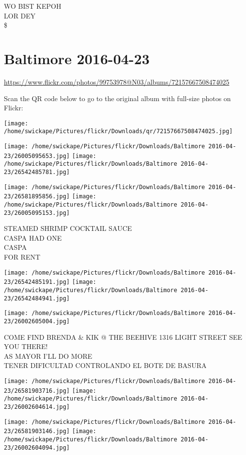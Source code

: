 \documentclass[10pt,letterpaper]{article}
\begin{document}
WO BIST KEPOH\\
LOR DEY\\
\$
\pagebreak

\section*{Baltimore 2016-04-23}

\url{https://www.flickr.com/photos/99753978@N03/albums/72157667508474025}

Scan the QR code below to go to the original album with full-size photos on Flickr:

\texttt{[image: /home/swickape/Pictures/flickr/Downloads/qr/72157667508474025.jpg]}
\pagebreak

\texttt{[image: /home/swickape/Pictures/flickr/Downloads/Baltimore 2016-04-23/26005095653.jpg]}
\texttt{[image: /home/swickape/Pictures/flickr/Downloads/Baltimore 2016-04-23/26542485781.jpg]}

\texttt{[image: /home/swickape/Pictures/flickr/Downloads/Baltimore 2016-04-23/26581895856.jpg]}
\texttt{[image: /home/swickape/Pictures/flickr/Downloads/Baltimore 2016-04-23/26005095153.jpg]}

STEAMED SHRIMP COCKTAIL SAUCE\\
CASPA HAD ONE\\
CASPA\\
FOR RENT
\pagebreak

\texttt{[image: /home/swickape/Pictures/flickr/Downloads/Baltimore 2016-04-23/26542485191.jpg]}
\texttt{[image: /home/swickape/Pictures/flickr/Downloads/Baltimore 2016-04-23/26542484941.jpg]}

\vspace{0.25in}
\texttt{[image: /home/swickape/Pictures/flickr/Downloads/Baltimore 2016-04-23/26002605004.jpg]}

COME FIND BRENDA \& KIK @ THE BEEHIVE 1316 LIGHT STREET SEE YOU THERE!\\
AS MAYOR I'LL DO MORE\\
TENER DIFICULTAD CONTROLANDO EL BOTE DE BASURA
\pagebreak

\texttt{[image: /home/swickape/Pictures/flickr/Downloads/Baltimore 2016-04-23/26581903716.jpg]}
\texttt{[image: /home/swickape/Pictures/flickr/Downloads/Baltimore 2016-04-23/26002604614.jpg]}

\texttt{[image: /home/swickape/Pictures/flickr/Downloads/Baltimore 2016-04-23/26581903146.jpg]}
\texttt{[image: /home/swickape/Pictures/flickr/Downloads/Baltimore 2016-04-23/26002604094.jpg]}
\end{document}

